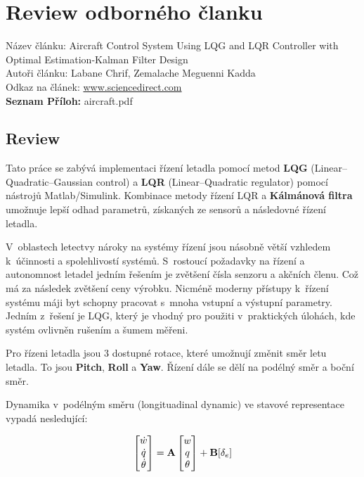 \chapter{Review odborného članku}

Název článku: Aircraft Control System Using LQG and LQR Controller with Optimal
Estimation-Kalman Filter Design \\
Autoři článku: Labane Chrif, Zemalache Meguenni Kadda \\
Odkaz na článek:
\href{https://www.sciencedirect.com/science/article/pii/S1877705814011771}{www.sciencedirect.com} \\
\textbf{Seznam Příloh:} aircraft.pdf 

\section{Review}

Tato práce se zabývá implementaci řízení letadla pomocí metod \textbf{LQG}
(Linear–Quadratic–Gaussian control) a \textbf{LQR} (Linear–Quadratic regulator) pomocí
nástrojů Matlab/Simulink. Kombinace metody řízení LQR a \textbf{Kálmánová
filtra} umožnuje
lepší odhad parametrů, získaných ze sensorů a následovné řízení letadla.



V oblastech letectvy nároky na systémy řízení jsou násobně větší vzhledem
k účinnosti a spolehlivostí systémů. S rostoucí požadavky na řízení a
autonomnost letadel jedním řešením je zvětšení čísla senzoru a akčních členu.
Což má za následek zvětšení ceny výrobku. Nicméně moderny přístupy k řízení
systému máji byt schopny pracovat s mnoha vstupní a výstupní parametry. Jedním
z řešení je LQG, který je vhodný pro použiti v praktických úlohách, kde systém
ovlivněn rušením a šumem měřeni.


Pro řízeni letadla jsou 3 dostupné rotace, které umožnují změnit směr letu
letadla. To jsou \textbf{Pitch}, \textbf{Roll} a \textbf{Yaw}. Řízení dále se dělí na podélný směr a boční
směr.


Dynamika v podélným směru (longituadinal dynamic) ve stavové representace vypadá
nesledující:

\begin{equation}
    \begin{bmatrix}
        \dot{w} \\
        \dot{q} \\
        \dot{\theta} 
    \end{bmatrix} 
    = \textbf{A}   
    \begin{bmatrix}
        w \\
        q \\
        \theta 
    \end{bmatrix} 
    + \textbf{B} [\delta_e] \\
\end{equation}

